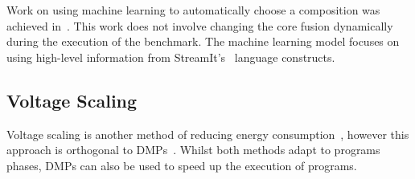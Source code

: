 Work on using machine learning to automatically choose a composition was achieved in~\cite{micolet2016dmpstream}.
This work does not involve changing the core fusion dynamically during the execution of the benchmark.
The machine learning model focuses on using high-level information from StreamIt's~\cite{thiesStreamit2010} language constructs.

\subsection{Voltage Scaling}
Voltage scaling is another method of reducing energy consumption~\cite{paganiEECHM2017}, however this approach is orthogonal to DMPs~\cite{sibi}.
Whilst both methods adapt to programs phases, DMPs can also be used to speed up the execution of programs.
